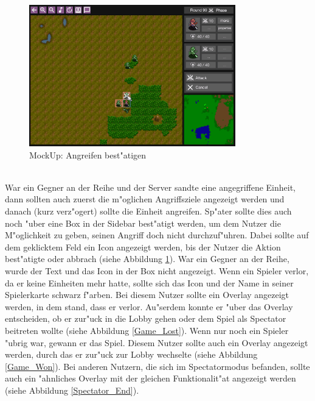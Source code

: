 \documentclass[12pt, titlepage]{scrartcl}
\newcounter{subsubsubsection}[subsubsection]
\begin{document}
			        \begin{figure}[H] 
    				    \centering
    				    \includegraphics[width=0.8\textwidth]{images/mockUps/Attack.png}
    				    \caption{MockUp: Angreifen best"atigen}
    				    \label{Attack}
			        \end{figure}
		        	\ \\ War ein Gegner an der Reihe und der Server sandte eine angegriffene Einheit, dann sollten auch zuerst die m"oglichen Angriffsziele angezeigt werden und danach (kurz verz"ogert) sollte die Einheit angreifen. Sp"ater sollte dies auch noch "uber eine Box in der Sidebar best"atigt werden, um dem Nutzer die M"oglichkeit zu geben, seinen Angriff doch nicht durchzuf"uhren. Dabei sollte auf dem geklicktem Feld ein Icon angezeigt werden, bis der Nutzer die Aktion best"atigte oder abbrach (siehe Abbildung \ref{Attack}). War ein Gegner an der Reihe, wurde der Text und das Icon in der Box nicht angezeigt.
			        Wenn ein Spieler verlor, da er keine Einheiten mehr hatte, sollte sich das Icon und der Name in seiner Spielerkarte schwarz f"arben. Bei diesem Nutzer sollte ein Overlay angezeigt werden, in dem stand, dass er verlor. Au"serdem konnte er "uber das Overlay entscheiden, ob er zur"uck in die Lobby gehen oder dem Spiel als Spectator beitreten wollte (siehe Abbildung \ref{Game_Lost}). Wenn nur noch ein Spieler "ubrig war, gewann er das Spiel. Diesem Nutzer sollte auch ein Overlay angezeigt werden, durch das er zur"uck zur Lobby wechselte (siehe Abbildung \ref{Game_Won}). Bei anderen Nutzern, die sich im Spectatormodus befanden, sollte auch ein "ahnliches Overlay mit der gleichen Funktionalit"at angezeigt werden (siehe Abbildung \ref{Spectator_End}).
\end{document}
